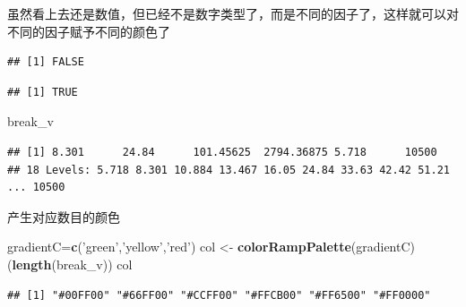 \documentclass[]{article}
\newenvironment{Shaded}{\begin{snugshade}}{\end{snugshade}}
\newcommand{\KeywordTok}[1]{\textcolor[rgb]{0.13,0.29,0.53}{\textbf{{#1}}}}
\newcommand{\StringTok}[1]{\textcolor[rgb]{0.31,0.60,0.02}{{#1}}}
\newcommand{\NormalTok}[1]{{#1}}
\numberwithin{figure}{section}
\numberwithin{table}{section}
\theoremstyle{definition}
\theoremstyle{definition}
\theoremstyle{definition}
\theoremstyle{remark}
\begin{document}
虽然看上去还是数值，但已经不是数字类型了，而是不同的因子了，这样就可以对不同的因子赋予不同的颜色了

\begin{Shaded}
\end{Shaded}

\begin{verbatim}
## [1] FALSE
\end{verbatim}

\begin{Shaded}
\end{Shaded}

\begin{verbatim}
## [1] TRUE
\end{verbatim}

\begin{Shaded}
\begin{Highlighting}[]
\NormalTok{break_v}
\end{Highlighting}
\end{Shaded}

\begin{verbatim}
## [1] 8.301      24.84      101.45625  2794.36875 5.718      10500     
## 18 Levels: 5.718 8.301 10.884 13.467 16.05 24.84 33.63 42.42 51.21 ... 10500
\end{verbatim}

产生对应数目的颜色

\begin{Shaded}
\begin{Highlighting}[]
\NormalTok{gradientC=}\KeywordTok{c}\NormalTok{(}\StringTok{'green'}\NormalTok{,}\StringTok{'yellow'}\NormalTok{,}\StringTok{'red'}\NormalTok{)}
\NormalTok{col <-}\StringTok{ }\KeywordTok{colorRampPalette}\NormalTok{(gradientC)(}\KeywordTok{length}\NormalTok{(break_v))}
\NormalTok{col}
\end{Highlighting}
\end{Shaded}

\begin{verbatim}
## [1] "#00FF00" "#66FF00" "#CCFF00" "#FFCB00" "#FF6500" "#FF0000"
\end{verbatim}
\end{document}
